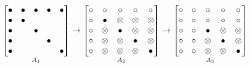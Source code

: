 \documentclass{standalone}
\begin{document}
\begin{equation*}
\mathop{
\begin{bmatrix}
\bullet & \bullet & \bullet & \bullet & \bullet \\
\bullet & \bullet & \space & \space & \space \\
\bullet & \space & \bullet & \space & \space \\
\bullet & \space & \space & \bullet & \space \\
\bullet & \space & \space & \space & \bullet \\
\end{bmatrix}
}\limits_{A_1}
\rightarrow
\mathop{
\begin{bmatrix}
\circ & \circ & \circ & \circ & \circ \\
\circ & \bullet & \otimes & \otimes & \otimes \\
\circ & \otimes & \bullet & \otimes & \otimes \\
\circ & \otimes & \otimes & \bullet & \otimes \\
\circ & \otimes & \otimes & \otimes & \bullet \\
\end{bmatrix}
}\limits_{A_2}
\rightarrow
\mathop{
\begin{bmatrix}
\circ & \circ & \circ & \circ & \circ \\
\circ & \circ & \circ & \circ & \circ \\
\circ & \circ & \bullet & \otimes & \otimes \\
\circ & \circ & \otimes & \bullet & \otimes \\
\circ & \circ & \otimes & \otimes & \bullet \\
\end{bmatrix}
}\limits_{A_3}
\end{equation*}
\end{document}
